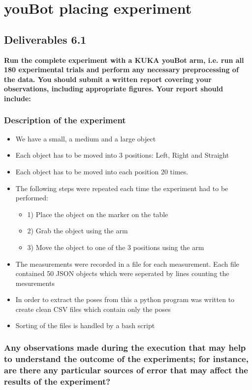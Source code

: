 \chapter{youBot placing experiment}
\section{Deliverables 6.1}
\textbf{Run the complete experiment with a KUKA youBot arm, i.e. run all 180 experimental trials and perform any necessary preprocessing of the data. You should submit a written report covering your observations, including appropriate figures. Your report should include:}

\subsection{Description of the experiment}

\begin{itemize}
	\item We have a small, a medium and a large object
	\item Each object has to be moved into 3 positions: Left, Right and Straight
	\item Each object has to be moved into each position 20 times.
	\item The following steps were repeated each time the experiment had to be performed:
	\begin{itemize}
		\item 1) Place the object on the marker on the table
		\item 2) Grab the object using the arm
		\item 3) Move the object to one of the 3 positions using the arm
	\end{itemize}
	\item The measurements were recorded in a file for each measurement. Each file contained 50 JSON objects which were seperated by lines counting the mesurements
	\item In order to extract the poses from this a python program was written to create clean CSV files which contain only the poses
	\item Sorting of the files is handled by a bash script 
\end{itemize}


\subsection{Any observations made during the execution that may help to understand the outcome of the experiments; for instance, are there any particular sources of error that may affect the results of the experiment?}


